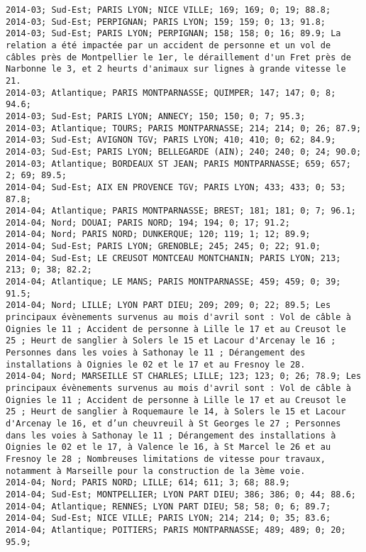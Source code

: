 \documentclass{article}
\begin{document}
\begin{Verbatim}[commandchars=\\\{\}]
2014-03; Sud-Est; PARIS LYON; NICE VILLE; 169; 169; 0; 19; 88.8; 
2014-03; Sud-Est; PERPIGNAN; PARIS LYON; 159; 159; 0; 13; 91.8; 
2014-03; Sud-Est; PARIS LYON; PERPIGNAN; 158; 158; 0; 16; 89.9; La relation a été impactée par un accident de personne et un vol de câbles près de Montpellier le 1er, le déraillement d'un Fret près de Narbonne le 3, et 2 heurts d'animaux sur lignes à grande vitesse le 21.
2014-03; Atlantique; PARIS MONTPARNASSE; QUIMPER; 147; 147; 0; 8; 94.6; 
2014-03; Sud-Est; PARIS LYON; ANNECY; 150; 150; 0; 7; 95.3; 
2014-03; Atlantique; TOURS; PARIS MONTPARNASSE; 214; 214; 0; 26; 87.9; 
2014-03; Sud-Est; AVIGNON TGV; PARIS LYON; 410; 410; 0; 62; 84.9; 
2014-03; Sud-Est; PARIS LYON; BELLEGARDE (AIN); 240; 240; 0; 24; 90.0; 
2014-03; Atlantique; BORDEAUX ST JEAN; PARIS MONTPARNASSE; 659; 657; 2; 69; 89.5; 
2014-04; Sud-Est; AIX EN PROVENCE TGV; PARIS LYON; 433; 433; 0; 53; 87.8; 
2014-04; Atlantique; PARIS MONTPARNASSE; BREST; 181; 181; 0; 7; 96.1; 
2014-04; Nord; DOUAI; PARIS NORD; 194; 194; 0; 17; 91.2; 
2014-04; Nord; PARIS NORD; DUNKERQUE; 120; 119; 1; 12; 89.9; 
2014-04; Sud-Est; PARIS LYON; GRENOBLE; 245; 245; 0; 22; 91.0; 
2014-04; Sud-Est; LE CREUSOT MONTCEAU MONTCHANIN; PARIS LYON; 213; 213; 0; 38; 82.2; 
2014-04; Atlantique; LE MANS; PARIS MONTPARNASSE; 459; 459; 0; 39; 91.5; 
2014-04; Nord; LILLE; LYON PART DIEU; 209; 209; 0; 22; 89.5; Les principaux évènements survenus au mois d'avril sont : Vol de câble à Oignies le 11 ; Accident de personne à Lille le 17 et au Creusot le 25 ; Heurt de sanglier à Solers le 15 et Lacour d'Arcenay le 16 ; Personnes dans les voies à Sathonay le 11 ; Dérangement des installations à Oignies le 02 et le 17 et au Fresnoy le 28.
2014-04; Nord; MARSEILLE ST CHARLES; LILLE; 123; 123; 0; 26; 78.9; Les principaux évènements survenus au mois d'avril sont : Vol de câble à Oignies le 11 ; Accident de personne à Lille le 17 et au Creusot le 25 ; Heurt de sanglier à Roquemaure le 14, à Solers le 15 et Lacour d'Arcenay le 16, et d’un cheuvreuil à St Georges le 27 ; Personnes dans les voies à Sathonay le 11 ; Dérangement des installations à Oignies le 02 et le 17, à Valence le 16, à St Marcel le 26 et au Fresnoy le 28 ; Nombreuses limitations de vitesse pour travaux, notamment à Marseille pour la construction de la 3ème voie.
2014-04; Nord; PARIS NORD; LILLE; 614; 611; 3; 68; 88.9; 
2014-04; Sud-Est; MONTPELLIER; LYON PART DIEU; 386; 386; 0; 44; 88.6; 
2014-04; Atlantique; RENNES; LYON PART DIEU; 58; 58; 0; 6; 89.7; 
2014-04; Sud-Est; NICE VILLE; PARIS LYON; 214; 214; 0; 35; 83.6; 
2014-04; Atlantique; POITIERS; PARIS MONTPARNASSE; 489; 489; 0; 20; 95.9; 

\end{Verbatim}
\end{document}

